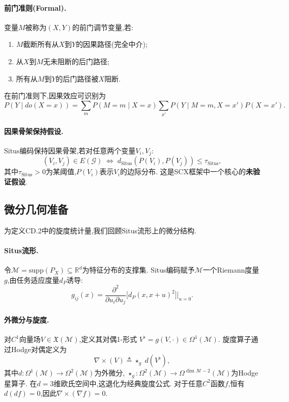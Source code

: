 \documentclass[12pt,a4paper]{article}
\newcommand{\R}{\mathbb{R}}
\newcommand{\cG}{\mathcal{G}}
\newcommand{\cM}{\mathcal{M}}
\newcommand{\Situs}{\mathrm{Situs}}
\newcommand{\supp}{\mathrm{supp}}
\newcommand{\curl}{\nabla\! \times\!}
\newcommand{\grad}{\nabla}
\newcommand{\defeq}{\triangleq}
\begin{document}
\paragraph{前门准则(Formal).}
变量$M$被称为$(X,Y)$的前门调节变量,若:
\begin{enumerate}[label=(FD\arabic*)]
    \item $M$截断所有从$X$到$Y$的因果路径(完全中介);
    \item 从$X$到$M$无未阻断的后门路径;
    \item 所有从$M$到$Y$的后门路径被$X$阻断.
\end{enumerate}
在前门准则下,因果效应可识别为
\begin{equation}\label{eq:front-door-formal}
    P(Y \mid do(X=x)) = \sum_m P(M=m \mid X=x)
    \sum_{x'} P(Y \mid M=m, X=x') P(X=x').
\end{equation}

\paragraph{因果骨架保持假设.}
Situs编码保持因果骨架,若对任意两个变量$V_i, V_j$:
\begin{equation}\label{eq:skeleton-preservation}
    (V_i, V_j) \in E(\cG) \;\Longleftrightarrow\;
    d_{\Situs}(P(V_i), P(V_j)) \leq \tau_{\Situs},
\end{equation}
其中$\tau_{\Situs} > 0$为某阈值,$P(V_i)$表示$V_i$的边际分布.
这是SCX框架中一个核心的\textbf{未验证假设}.

\subsection{微分几何准备}

为定义CD.2中的旋度统计量,我们回顾Situs流形上的微分结构.

\paragraph{Situs流形.} 令$\cM = \supp(P_X) \subseteq \R^d$为特征分布的支撑集.
Situs编码赋予$\cM$一个Riemann度量$g$,由任务适应度量$d_P$诱导:
\begin{equation}\label{eq:situs-metric}
    g_{ij}(x) = \frac{\partial^2}{\partial u_i \partial u_j}
    \big[d_P(x, x+u)^2\big]\big|_{u=0}.
\end{equation}

\paragraph{外微分与旋度.}
对$C^1$向量场$V \in \mathfrak{X}(\cM)$,定义其对偶1-形式
$V^\flat = g(V, \cdot) \in \Omega^1(\cM)$.
旋度算子通过Hodge对偶定义为
\begin{equation}\label{eq:curl-def}
    \curl(V) \defeq \star_g \; d(V^\flat),
\end{equation}
其中$d: \Omega^1(\cM) \to \Omega^2(\cM)$为外微分,
$\star_g: \Omega^2(\cM) \to \Omega^{\dim\cM-2}(\cM)$为Hodge星算子.
在$d=3$维欧氏空间中,这退化为经典旋度公式.
对于任意$C^2$函数$f$,恒有$d(df)=0$,因此$\curl(\grad f)=0$.
\end{document}
